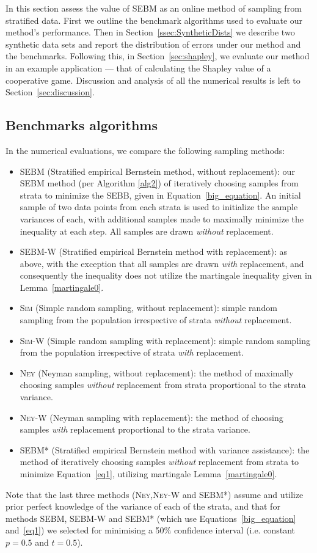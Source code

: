 \documentclass[]{interact}
\theoremstyle{plain}%
\theoremstyle{definition}
\theoremstyle{remark}
\begin{document}
In this section assess the value of SEBM as an online method of sampling from stratified data.
First we outline the benchmark algorithms used to evaluate our method's performance.
Then in Section~\ref{ssec:SyntheticDists}
we describe two synthetic data sets and report the distribution of errors under our method and the benchmarks.
Following this, in Section~\ref{sec:shapley}, we evaluate our method in an example application --- that of calculating the Shapley value of a cooperative game.
Discussion and analysis of all the numerical results is left to Section~\ref{sec:discussion}.



\subsection{Benchmarks algorithms}
In the numerical evaluations, we compare the following sampling methods:
\begin{itemize}
\item 
\textsc{SEBM} (Stratified empirical Bernstein method, without replacement):
our SEBM method (per Algorithm \ref{alg2}) of iteratively choosing samples from strata to minimize the SEBB, given in Equation~\eqref{big_equation}. 
An initial sample of two data points from each strata is used to initialize the sample variances of each, with additional samples made to maximally minimize the inequality at each step. All samples are drawn \textit{without} replacement.
\item 
\textsc{SEBM-W} (Stratified empirical Bernstein method with replacement): 
as above, with the exception that all samples are drawn \textit{with} replacement, and consequently the inequality does not utilize the martingale inequality given in Lemma~\ref{martingale0}.
\item 
\textsc{Sim} (Simple random sampling, without replacement): simple random sampling from the population irrespective of strata \textit{without} replacement.
\item 
\textsc{Sim-W} (Simple random sampling with replacement): 
simple random sampling from the population irrespective of strata \textit{with} replacement.
\item \textsc{Ney} (Neyman sampling, without replacement): the method of maximally choosing samples \textit{without} replacement from strata proportional to the strata variance.
\item \textsc{Ney-W} (Neyman sampling with replacement): the method of choosing samples \textit{with} replacement proportional to the strata variance.
\item \textsc{SEBM*} (Stratified empirical Bernstein method with variance assistance): the method of iteratively choosing samples \textit{without} replacement from strata to minimize Equation~\eqref{eq1}, utilizing martingale Lemma~\ref{martingale0}.
\end{itemize}
Note that the last three methods (\textsc{Ney},\textsc{Ney-W} and SEBM*) assume and utilize prior perfect knowledge of the variance of each of the strata, and that for methods SEBM, SEBM-W and SEBM* (which use Equations~\eqref{big_equation} and~\eqref{eq1}) we selected for minimising a 50\% confidence interval (i.e. constant $p=0.5$ and $t=0.5$).
\end{document}
